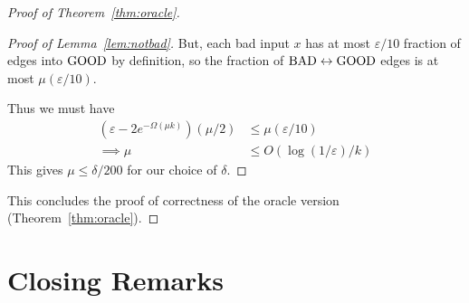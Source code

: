 \documentclass[]{article}
\newcommand{\1}{\mathbb{1}}
\renewcommand{\epsilon}{\varepsilon}
\newcommand{\eps}{\epsilon}
\begin{document}
\begin{proof}[Proof of Theorem~\ref{thm:oracle}]
\begin{proof}[Proof of Lemma~\ref{lem:notbad}]
But, each bad input $x$ has at most $\eps/10$ fraction of edges into $\text{GOOD}$ by
definition, so the fraction of $\text{BAD} \leftrightarrow \text{GOOD}$ edges is at most
$\mu (\eps/10)$.

Thus we must have
\begin{align*}
    (\epsilon - 2e^{-\Omega(\mu k)}) (\mu/2)
    &\leq
\mu (\eps/10)\\
\implies
\mu &\leq O(\log(1/\eps)/k)
\end{align*}
This gives $\mu \leq \delta/200$ for our choice of $\delta$.
\end{proof}

This concludes the proof of correctness of the oracle version
(Theorem~\ref{thm:oracle}).
\end{proof}

\section{Closing Remarks}
\end{document}
